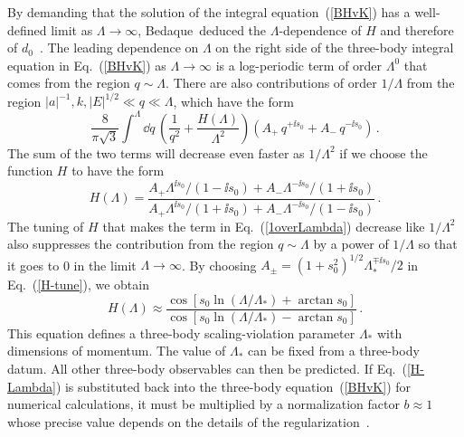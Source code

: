 By demanding that the solution of the integral equation~(\ref{BHvK}) 
has a well-defined limit as $\Lambda \to \infty$, 
Bedaque~\etal deduced the $\Lambda$-dependence 
of $H$ and therefore of $d_0$~\cite{Bedaque:1998kg}. 
The leading dependence on $\Lambda$ on the right side of the
three-body integral equation in Eq.~(\ref{BHvK}) as $\Lambda \to \infty$ 
is a log-periodic term of order $\Lambda^0$ that comes from the 
region $q \sim \Lambda$.  
There are also contributions of order $1/\Lambda$
from the region $|a|^{-1},k,|E|^{1/2} \ll q \ll \Lambda$,
which have the form
\begin{equation}
 \frac{8}{\pi\sqrt{3}} \int^\Lambda \dd q \, 
 \left( \frac{1}{q^2}+ \frac{H(\Lambda)}{\Lambda^2}\right)
 (A_+ \, q^{+\ii s_0} + A_- \, q^{-\ii s_0}) \,.
\label{1overLambda}
\end{equation}
The sum of the two terms will decrease even faster as $1/\Lambda^2$ 
if we choose the function $H$ to have the form
\begin{equation}
 H(\Lambda) =
 \frac{ A_+ \Lambda^{\ii s_0}/(1-\ii s_0) + A_- \Lambda^{-\ii s_0}/(1+\ii s_0)}
 {A_+ \Lambda^{\ii s_0}/(1+\ii s_0)  + A_- \Lambda^{-\ii s_0}/(1-\ii s_0)} \,.
\label{H-tune}
\end{equation}
The tuning of $H$ 
that makes the term in Eq.~(\ref{1overLambda}) decrease like
$1/\Lambda^2$ also suppresses the contribution from the region
$q \sim \Lambda$ by a power of $1/\Lambda$  so that it goes to 0 
in the limit $\Lambda \to \infty$.
By choosing $A_\pm = (1 + s_0^2)^{1/2} \Lambda_*^{\mp \ii s_0}/2$
in Eq.~(\ref{H-tune}), we obtain~\cite{Bedaque:1998kg}
\begin{equation}
 H (\Lambda) \approx \frac{\cos [s_0 \ln (\Lambda/ \Lambda_*) + \arctan s_0]}
 {\cos [s_0 \ln (\Lambda/ \Lambda_*) - \arctan s_0]} \,.
\label{H-Lambda}
\end{equation}
This equation defines a three-body scaling-violation parameter 
$\Lambda_*$ with dimensions of momentum. The value of $\Lambda_*$
can be fixed from a three-body datum. All other three-body
observables can then be predicted. If Eq.~(\ref{H-Lambda}) is 
substituted back into the three-body equation~(\ref{BHvK})
for numerical calculations, it must be multiplied by a normalization factor
$b\approx 1$ whose precise value
depends on the details of the regularization~\cite{Braaten:2011sz}.


